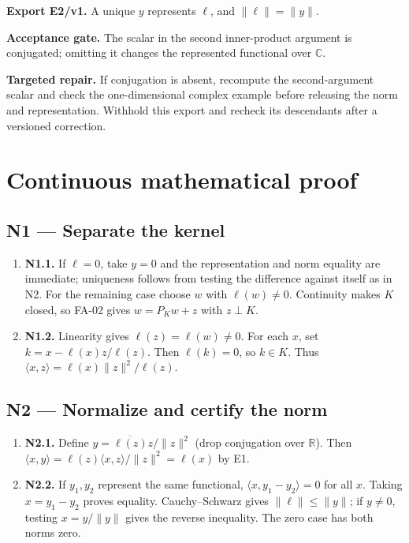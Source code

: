 \documentclass[preprint,12pt,aps,pra,showkeys,amsmath,amssymb,superscriptaddress,floatfix]{revtex4-2}
\theoremstyle{definition}
\theoremstyle{remark}
\newcommand{\field}[2]{\par\smallskip\noindent\textbf{#1.} #2\par}
\begin{document}
\field{Export E2/v1}{A unique \(y\) represents \(\ell\), and \(\|\ell\|=\|y\|\).}

\field{Acceptance gate}{The scalar in the second inner-product argument is conjugated; omitting
it changes the represented functional over \(\mathbb C\).}

\field{Targeted repair}{If conjugation is absent, recompute the second-argument scalar and check
the one-dimensional complex example before releasing the norm and
representation. Withhold this export and recheck its descendants after a
versioned correction.}

\endgroup\clearpage\section{Continuous mathematical proof}\label{sec:proof}

\subsection{N1 --- Separate the kernel}\label{n1-separate-the-kernel}

\begin{enumerate}
\def\labelenumi{\arabic{enumi}.}
\item
  \textbf{N1.1.} If \(\ell=0\), take \(y=0\) and the representation and
  norm equality are immediate; uniqueness follows from testing the
  difference against itself as in N2. For the remaining case choose
  \(w\) with \(\ell(w)\ne0\). Continuity makes \(K\) closed, so FA-02
  gives \(w=P_Kw+z\) with \(z\perp K\).
\item
  \textbf{N1.2.} Linearity gives \(\ell(z)=\ell(w)\ne0\). For each
  \(x\), set \(k=x-\ell(x)z/\ell(z)\). Then \(\ell(k)=0\), so
  \(k\in K\). Thus \(\langle x,z\rangle=\ell(x)\|z\|^2/\ell(z)\).
\end{enumerate}

\subsection{N2 --- Normalize and certify the
norm}\label{n2-normalize-and-certify-the-norm}

\begin{enumerate}
\def\labelenumi{\arabic{enumi}.}
\item
  \textbf{N2.1.} Define \(y=\overline{\ell(z)}z/\|z\|^2\) (drop
  conjugation over \(\mathbb R\)). Then
  \(\langle x,y\rangle=\ell(z)\langle x,z\rangle/\|z\|^2=\ell(x)\) by
  E1.
\item
  \textbf{N2.2.} If \(y_1,y_2\) represent the same functional,
  \(\langle x,y_1-y_2\rangle=0\) for all \(x\). Taking \(x=y_1-y_2\)
  proves equality. Cauchy--Schwarz gives \(\|\ell\|\le\|y\|\); if
  \(y\ne0\), testing \(x=y/\|y\|\) gives the reverse inequality. The
  zero case has both norms zero.
\end{enumerate}
\end{document}
